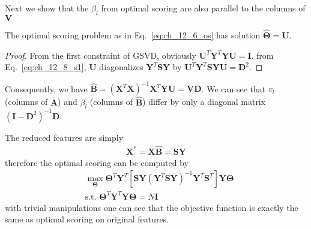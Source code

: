 \begin{exercise}
  Next we show that the $\beta_l$ from optimal scoring are also parallel to the
  columns of $\mathbf{V}$
  \begin{proposition}
    The optimal scoring problem as in Eq.~\eqref{eq:ch_12_6_os} has solution
    $\hat{\mathbf{\Theta}} = \mathbf{U}$.
  \end{proposition}
  \begin{proof}
    From the first constraint of GSVD, obviously
    $\mathbf{U}^T\mathbf{Y}^T\mathbf{YU}=\mathbf{I}$. from
    Eq.~\eqref{eq:ch_12_8_s1}, $\mathbf{U}$ diagonalizes
    $\mathbf{Y}^T\mathbf{SY}$ by $\mathbf{U}^T\mathbf{Y}^T\mathbf{SY}
    \mathbf{U} = \mathbf{D}^2$.
  \end{proof}
  Consequently, we have $\hat{\mathbf{B}} =
  (\mathbf{X}^T\mathbf{X})^{-1}\mathbf{X}^T\mathbf{YU} = \mathbf{VD}$. We can
  see that $v_l$ (columns of $\hat{\mathbf{A}}$) and $\beta_l$ (columns of
  $\hat{\mathbf{B}}$) differ by only a diagonal matrix $(\mathbf{I} -
  \mathbf{D}^2)^{-1}\mathbf{D}$.
\end{exercise}

\begin{exercise}
  The reduced features are simply
  \begin{align}
    \mathbf{X}^* = \mathbf{X}\hat{\mathbf{B}}= \mathbf{SY}
  \end{align}
  therefore the optimal scoring can be computed by 
  \begin{align}
    & \max_{\mathbf{\Theta}}\mathbf{\Theta}^T\mathbf{Y}^T
    [\mathbf{SY}(\mathbf{Y}^T\mathbf{SY})^{-1}\mathbf{Y}^T\mathbf{S}^T]
    \mathbf{Y\Theta} \\
    & \mbox{s.t. } \mathbf{\Theta}^T\mathbf{Y}^T\mathbf{Y\Theta} = N\mathbf{I}
  \end{align}
  with trivial manipulations one can see that the objective function is exactly
  the same as optimal scoring on original features.
\end{exercise}

\begin{exercise}

\end{exercise}